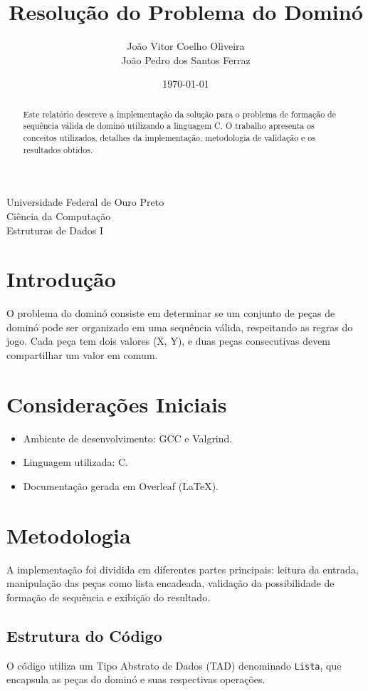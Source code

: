 \documentclass[a4paper,12pt]{article}
\title{Resolu\c{c}\~ao do Problema do Domin\'o}
\author{Jo\~ao Vitor Coelho Oliveira \\ Jo\~ao Pedro dos Santos Ferraz}
\date{\today}
\begin{document}
\maketitle

\begin{center}
    Universidade Federal de Ouro Preto\\
    Ci\^encia da Computa\c{c}\~ao\\
    Estruturas de Dados I
\end{center}

\begin{abstract}
    Este relat\'orio descreve a implementa\c{c}\~ao da solu\c{c}\~ao para o problema de forma\c{c}\~ao de sequ\^encia v\'alida de domin\'o utilizando a linguagem C. O trabalho apresenta os conceitos utilizados, detalhes da implementa\c{c}\~ao, metodologia de valida\c{c}\~ao e os resultados obtidos.
\end{abstract}

\section{Introdu\c{c}\~ao}
O problema do domin\'o consiste em determinar se um conjunto de pe\c{c}as de domin\'o pode ser organizado em uma sequ\^encia v\'alida, respeitando as regras do jogo. Cada pe\c{c}a tem dois valores (X, Y), e duas pe\c{c}as consecutivas devem compartilhar um valor em comum.

\section{Considera\c{c}\~oes Iniciais}
\begin{itemize}
    \item Ambiente de desenvolvimento: GCC e Valgrind.
    \item Linguagem utilizada: C.
    \item Documenta\c{c}\~ao gerada em Overleaf (LaTeX).
\end{itemize}

\section{Metodologia}
A implementa\c{c}\~ao foi dividida em diferentes partes principais: leitura da entrada, manipula\c{c}\~ao das pe\c{c}as como lista encadeada, valida\c{c}\~ao da possibilidade de forma\c{c}\~ao de sequ\^encia e exibi\c{c}\~ao do resultado.

\subsection{Estrutura do C\'odigo}
O c\'odigo utiliza um Tipo Abstrato de Dados (TAD) denominado \texttt{Lista}, que encapsula as pe\c{c}as do domin\'o e suas respectivas opera\c{c}\~oes.
\end{document}
